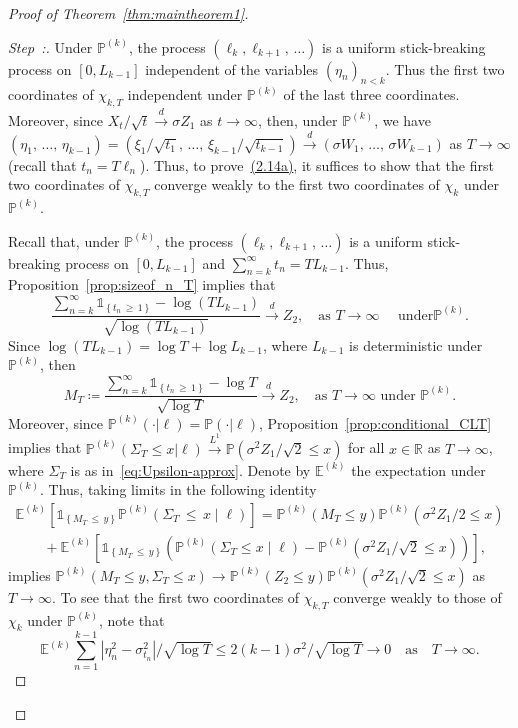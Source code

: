 \documentclass[10pt]{amsart}
\theoremstyle{definition}\newtheorem{defi}[theo]{Definition}\newtheorem{rema}[theo]{Remark}\newtheorem{exam}[theo]{Example}\newtheorem{exem}[theo]{Example}\newtheorem{nota}[theo]{Notation}
\newcommand\R{\mathbb{R}}
\newcommand\E{\mathds{E}}
\newcommand\p{\mathds{P}}
\newcommand\1{\mathds{1}}
\newcommand\cid{\xrightarrow{d}}
\newcommand\ciL{\xrightarrow{L^1}}
\newcounter{stepcount}
\newenvironment{step}{\refstepcounter{stepcount}\begin{proof}[Step~\thestepcount:]}{\let\qed\relax\end{proof}}
\begin{document}
\begin{proof}[Proof of Theorem~\ref{thm:maintheorem1}]
\begin{step}
Under $\p^{(k)}$, the process $(\ell_k,\ell_{k+1},\,\ldots)$ is a uniform stick-breaking process on $[0,L_{k-1}]$ independent of the variables $(\eta_n)_{n<k}$. Thus the first two coordinates of $\chi_{k,T}$ independent under $\p^{(k)}$ of the last three coordinates. Moreover, since $X_t/\sqrt{t}\cid \sigma Z_1$ as $t\to\infty$, then, under $\p^{(k)}$, we have $(\eta_1,\,\ldots,\,\eta_{k-1}) =(\xi_1/\sqrt{t_1},\,\ldots,\,\xi_{k-1}/\sqrt{t_{k-1}}) \cid(\sigma W_1,\,\ldots,\,\sigma W_{k-1})$ as $T\to\infty$ (recall that $t_n=T\ell_n$). Thus, to prove~\hyperref[eq:quintuple-Billingsley]{(2.14a)}, it suffices to show that the first two coordinates of $\chi_{k,T}$ converge weakly to the first two coordinates of $\chi_k$ under $\p^{(k)}$.

Recall that, under $\p^{(k)}$, the process $(\ell_k,\ell_{k+1},\,\ldots)$ is a uniform stick-breaking process on $[0,L_{k-1}]$ and $\sum_{n=k}^\infty t_n=TL_{k-1}$. Thus, Proposition~\ref{prop:sizeof_n_T} implies that
\[
\frac{\sum\limits_{n=k}^\infty\1_{\left\{t_n\,\ge\, 1\right\}}-\log \left(TL_{k-1}\right)}{\sqrt{\log \left(TL_{k-1}\right)}}
\cid Z_2,
\quad \text{as }T\to\infty\quad\text{ under}\p^{(k)}.
\]
Since $\log(TL_{k-1})=\log T+\log L_{k-1}$, where $L_{k-1}$ is deterministic under $\p^{(k)}$, then
\[
M_T\coloneqq\frac{\sum\limits_{n=k}^\infty\1_{\left\{t_n\,\ge\,1\right\}}-\log T}{\sqrt{\log T}}
\cid Z_2,
\quad \text{as $T\to\infty$ under $\p^{(k)}$.}
\]
Moreover, since $\p^{(k)}(\cdot|\ell)=\p(\cdot|\ell)$, Proposition~\ref{prop:conditional_CLT} implies that $\p^{(k)}(\Sigma_T\le x|\ell)\ciL\p(\sigma^2Z_1/\sqrt{2}\le x)$ for all $x\in\R$ as $T\to\infty$, where $\Sigma_T$ is as in~\eqref{eq:Upsilon-approx}. Denote by $\E^{(k)}$ the expectation under $\p^{(k)}$. Thus, taking limits in the following identity
\begin{multline*}
\E^{(k)} \left[\1_{\left\{M_T\,\le\,y\right\}}\p^{(k)}\left(\Sigma_T\,\le\,x\middle|\ell\right)\right] =
\p^{(k)}\left(M_T\le y\right)\p^{(k)}\left(\sigma^2Z_1/2\le x\right)\\
\qquad+\E^{(k)}\left[\1_{\left\{M_T\,\le\,y\right\}} \left(\p^{(k)}\left(\Sigma_T\le x\middle|\ell\right)-\p^{(k)}\left(\sigma^2Z_1/\sqrt{2}\le x\right)\right)\right],
\end{multline*}
implies $\p^{(k)}(M_T\le y,\Sigma_T\le x)\to \p^{(k)}(Z_2\le y)\p^{(k)}(\sigma^2Z_1/\sqrt{2}\le x)$ as $T\to\infty$. To see that the first two coordinates of $\chi_{k,T}$ converge weakly to those of $\chi_k$ under $\p^{(k)}$, note that
\[
\E^{(k)}\sum_{n=1}^{k-1} \left|\eta_n^2-\sigma_{t_n}^2\right|/\sqrt{\log T}
\le 2(k-1)\sigma^2/\sqrt{\log T}\to0\quad\text{as}\quad T\to\infty.
\]
\end{step}



\end{proof}
\end{document}
